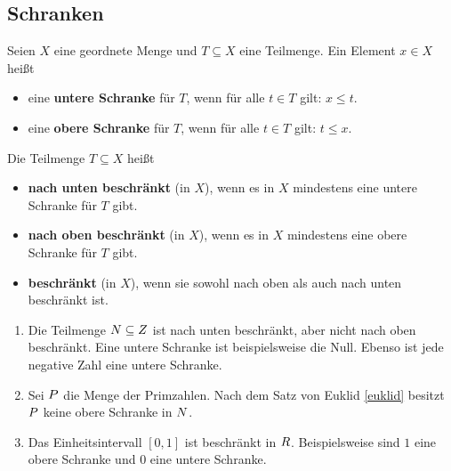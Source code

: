 \subsection*{Schranken}


\begin{defin}[Schranken] \label{def:schranken}  
    Seien $X$ eine geordnete Menge und $T\subseteq X$ eine Teilmenge. Ein Element $x\in X$ heißt
    \begin{itemize}
        \item eine \textbf{untere Schranke} für $T$, wenn für alle $t\in T$ gilt: $x\le t$.
        \item eine \textbf{obere Schranke} für $T$, wenn für alle $t\in T$ gilt: $t\le x$.
    \end{itemize}
    Die Teilmenge $T\subseteq X$ heißt
    \begin{itemize}
        \item \textbf{nach unten beschränkt} (in $X$), wenn es in $X$ mindestens eine untere Schranke für $T$ gibt.
        \item \textbf{nach oben beschränkt} (in $X$), wenn es in $X$ mindestens eine obere Schranke für $T$ gibt.
        \item \textbf{beschränkt} (in $X$), wenn sie sowohl nach oben als auch nach unten beschränkt ist.
    \end{itemize}
\end{defin}


\begin{bsp} \quad
    \begin{enumerate}
        \item Die Teilmenge $\relax N\subseteq \relax Z$ ist nach unten beschränkt, aber nicht nach oben beschränkt. Eine untere Schranke ist beispielsweise die Null. Ebenso ist jede negative Zahl eine untere Schranke.
        \item Sei $\relax P$ die Menge der Primzahlen. Nach dem Satz von Euklid \cref{euklid} besitzt $\relax P$ keine obere Schranke in $\relax N$.
        \item Das Einheitsintervall $[0,1]$ ist beschränkt in $\relax R$. Beispielsweise sind $1$ eine obere Schranke und $0$ eine untere Schranke.
    \end{enumerate}
\end{bsp}


